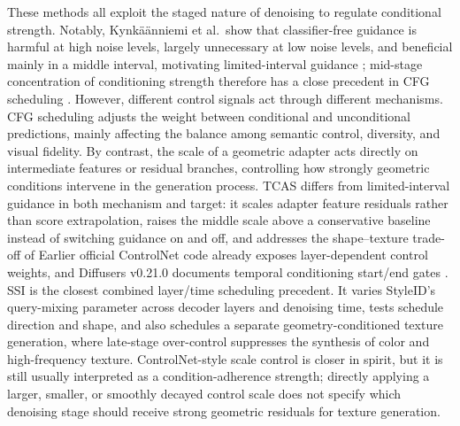 \documentclass[times,twocolumn,final]{elsarticle}
\providecommand{\DIFadd}[1]{{\protect\color{blue} \sf #1}} %
\providecommand{\DIFdel}[1]{{\protect\color{red} \scriptsize #1}} %
\providecommand{\DIFaddbegin}{} %
\providecommand{\DIFaddend}{} %
\providecommand{\DIFdelbegin}{} %
\providecommand{\DIFdelend}{} %
\begin{document}
\DIFdelbegin \DIFdel{These methods all exploit the staged nature of denoising to regulate conditional strength. Notably, Kynk\"a\"anniemi et al.\ show that classifier-free guidance is harmful at high noise levels, largely unnecessary at low noise levels, and beneficial mainly in a middle interval, motivating limited-interval guidance \cite{kynkanniemi2024limited}; mid-stage concentration of conditioning strength therefore has a close precedent in CFG scheduling . However, different control signals act through different mechanisms. CFG scheduling adjusts the weight between conditional and unconditional predictions, mainly affecting the balance among semantic control, diversity, and visual fidelity. By contrast, the scale of a geometric adapter acts directly on intermediate features or residual branches, controlling how strongly geometric conditions intervene in the generation process. TCAS differs from limited-interval guidance in both mechanism and target: it scales adapter feature residuals rather than score extrapolation, raises the middle scale above a conservative baseline instead of switching guidance on and off, and addresses the shape--texture trade-off of }\DIFdelend \DIFaddbegin \DIFadd{Earlier official ControlNet code already exposes layer-dependent control weights, and Diffusers v0.21.0 documents temporal conditioning start/end gates \cite{controlnet2023layercontrol,diffusers2023controlnet}. SSI is the closest combined layer/time scheduling precedent. It varies StyleID's query-mixing parameter \cite{chung2024styleid} across decoder layers and denoising time, tests schedule direction and shape, and also schedules a separate }\DIFaddend geometry-conditioned \DIFdelbegin \DIFdel{texture generation, where late-stage over-control suppresses the synthesis of color and high-frequency texture. ControlNet-style scale control is closer in spirit, but it is still usually interpreted as a condition-adherence strength; directly applying a larger, smaller, or smoothly decayed control scale does not specify which denoising stage should receive strong geometric residuals for texture generation.
}%
\end{document}
